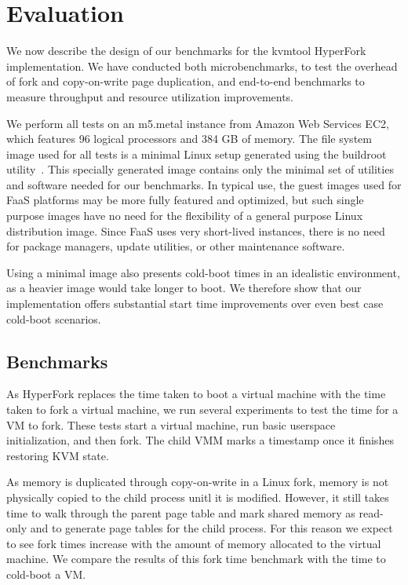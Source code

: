 \section{Evaluation} \label{sec:evaluation} We now describe the
design of our benchmarks for the kvmtool HyperFork implementation. We have
conducted both microbenchmarks, to test the overhead of fork and copy-on-write
page duplication, and end-to-end benchmarks to measure throughput and resource
utilization improvements.

We perform all tests on an m5.metal instance from Amazon Web Services EC2,
which features 96 logical processors and 384 GB of memory. The file system
image used for all tests is a minimal Linux setup generated using the buildroot
utility~\cite{buildroot}. This specially generated image contains only
the minimal set of utilities and software needed for our benchmarks. In typical
use, the guest images used for FaaS platforms may be more fully featured and
optimized, but such single purpose images have no need for the flexibility of a
general purpose Linux distribution image. Since FaaS uses very short-lived
instances, there is no need for package managers, update utilities, or other
maintenance software.

Using a minimal image also presents cold-boot times in an idealistic
environment, as a heavier image would take longer to boot. We therefore show
that our implementation offers substantial start time improvements over even
best case cold-boot scenarios.

\subsection{Benchmarks}

 As HyperFork replaces the time taken to boot a virtual
machine with the time taken to fork a virtual machine, we run several
experiments to test the time for a VM to fork. These tests start a virtual
machine, run basic userspace initialization, and then fork. The child VMM marks
a timestamp once it finishes restoring KVM state.

As memory is duplicated through copy-on-write in a Linux fork, memory is not
physically copied to the child process unitl it is modified. However, it still
takes time to walk through the parent page table and mark shared memory as
read-only and to generate page tables for the child process. For this reason we
expect to see fork times increase with the amount of memory allocated to the
virtual machine. We compare the results of this fork time benchmark with the
time to cold-boot a VM.

